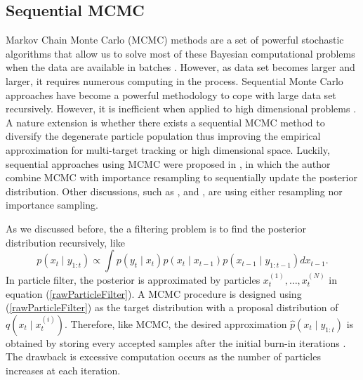 \subsection{Sequential MCMC}

Markov Chain Monte Carlo (MCMC) methods are a set of powerful stochastic algorithms that allow us to solve most of these Bayesian computational problems when the data are available in batches \cite{tierney1994markov}. However, as data set becomes larger and larger, it requires numerous computing in the process. Sequential Monte Carlo approaches have become a powerful methodology to cope with large data set recursively. However, it is inefficient when applied to high dimensional problems \cite{septier2009mcmc}. A nature extension is whether there exists a sequential MCMC method to diversify the degenerate particle population thus improving the empirical approximation for multi-target tracking or high dimensional space. Luckily, sequential approaches using MCMC were proposed in \cite{berzuini1997dynamic}, in which the author combine MCMC with importance resampling to sequentially update the posterior distribution. 
Other discussions, such as \cite{khan2005mcmc}, \cite{golightly2006bayesian} and \cite{pang2008models}, are using either resampling nor importance sampling. 

As we discussed before, the a filtering problem is to find the posterior distribution recursively, like 
\begin{equation}
p(x_t\mid y_{1:t}) \propto \int p(y_t\mid x_t)p(x_t\mid x_{t-1})p(x_{t-1}\mid y_{1:t-1})dx_{t-1}. 
\end{equation} 
In particle filter, the posterior is approximated by particles $x_t^{(1)},\dots,x_t^{(N)}$ in equation (\ref{rawParticleFilter}). A MCMC procedure is designed using (\ref{rawParticleFilter}) as the target distribution with a proposal distribution of $q(x_t\mid x_t^{(i)})$. Therefore, like MCMC, the desired approximation $\hat{p}(x_t\mid y_{1:t})$ is obtained by storing every accepted samples after the initial burn-in iterations \cite{septier2009mcmc}. The drawback is excessive computation occurs as the number of particles increases at each iteration. 

